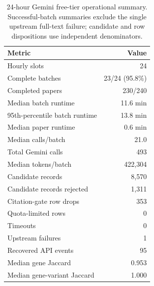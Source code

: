\begin{table}[!ht]
\centering
\caption{24-hour Gemini free-tier operational summary. Successful-batch summaries exclude the single upstream full-text failure; candidate and row dispositions use independent denominators.}
\label{tab:gemini-free-tier-summary}
\scriptsize
\setlength{\tabcolsep}{4pt}
\begin{tabular}{@{}lr@{}}
\toprule
\textbf{Metric} & \textbf{Value} \\
\midrule
Hourly slots & 24 \\
Complete batches & 23/24 (95.8\%) \\
Completed papers & 230/240 \\
Median batch runtime & 11.6 min \\
95th-percentile batch runtime & 13.8 min \\
Median paper runtime & 0.6 min \\
Median calls/batch & 21.0 \\
Total Gemini calls & 493 \\
Median tokens/batch & 422,304 \\
Candidate records & 8,570 \\
Candidate records rejected & 1,311 \\
Citation-gate row drops & 353 \\
Quota-limited rows & 0 \\
Timeouts & 0 \\
Upstream failures & 1 \\
Recovered API events & 95 \\
Median gene Jaccard & 0.953 \\
Median gene-variant Jaccard & 1.000 \\
\bottomrule
\end{tabular}
\end{table}
